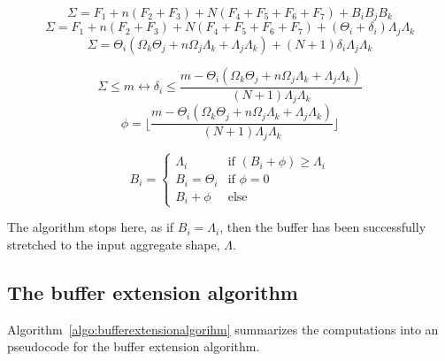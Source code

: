\documentclass[conference]{IEEEtran}
\begin{document}
$$\Sigma = F_1 + n(F_2 + F_3) + N(F_4 + F_5 + F_6 + F_7) + B_iB_jB_k$$
$$\Sigma = F_1 + n(F_2 + F_3) + N(F_4 + F_5 + F_6 + F_7) + (\Theta_i + \delta_i)\Lambda_j\Lambda_k$$
$$\Sigma = \Theta_i(\Omega_k\Theta_j + n\Omega_j\Lambda_k + \Lambda_j\Lambda_k) + (N+1)\delta_i\Lambda_j\Lambda_k$$

$$\Sigma \leq m \leftrightarrow \delta_i \leq \frac{m-\Theta_i(\Omega_k\Theta_j + n\Omega_j\Lambda_k + \Lambda_j\Lambda_k)}{(N+1)\Lambda_j\Lambda_k}$$
$$\phi = \lfloor \frac{m-\Theta_i(\Omega_k\Theta_j + n\Omega_j\Lambda_k + \Lambda_j\Lambda_k)}{(N+1)\Lambda_j\Lambda_k} \rfloor$$

$$B_i = \begin{cases}
  \Lambda_i & \textrm{if }(B_i+\phi) \geq \Lambda_i \\
  B_i = \Theta_i & \textrm{if }\phi = 0 \\
  B_i+\phi & \textrm{else}
\end{cases}$$

The algorithm stops here, as if $B_i=\Lambda_i$, then the buffer has been
successfully stretched to the input aggregate shape, $\Lambda$.

\subsection{The buffer extension algorithm}
Algorithm~\ref{algo:bufferextensionalgorihm} summarizes the computations into an
pseudocode for the buffer extension algorithm.
\end{document}
